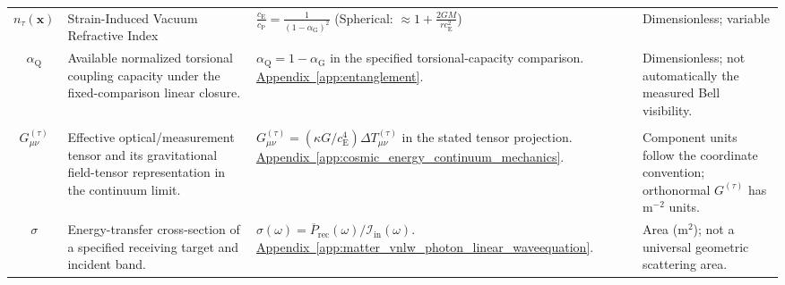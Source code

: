 \begin{longtable}{@{} c p{5.5cm} p{4cm} p{3.5cm} @{}}
$n_\tau(\mathbf{x})$ & Strain-Induced Vacuum Refractive Index & $\frac{c_{\mathrm{E}}}{c_{\mathrm{P}}} = \frac{1}{(1-\alpha_{\mathrm{G}})^2}$ \newline (Spherical: $\approx 1+\frac{2GM}{rc_{\mathrm{E}}^2}$) & Dimensionless; variable \\

$\alpha_{\mathrm Q}$ & {\raggedright Available normalized torsional coupling capacity under the fixed-comparison linear closure.\par} & {\raggedright $\alpha_{\mathrm Q}=1-\alpha_{\mathrm G}$ in the specified torsional-capacity comparison. \newline \hyperref[app:entanglement]{Appendix~\ref*{app:entanglement}}.\par} & {\raggedright Dimensionless; not automatically the measured Bell visibility.\par} \\

\begin{tabular}[c]{@{}c@{}}$g_{\mu\nu}^{(\tau)}$ \\ $G_{\mu\nu}^{(\tau)}$\end{tabular} & {\raggedright Effective optical/measurement tensor and its gravitational field-tensor representation in the continuum limit.\par} & {\raggedright $G_{\mu\nu}^{(\tau)}=(\kappa G/c_{\mathrm E}^4)\Delta T_{\mu\nu}^{(\tau)}$ in the stated tensor projection. \newline \hyperref[app:cosmic_energy_continuum_mechanics]{Appendix~\ref*{app:cosmic_energy_continuum_mechanics}}.\par} & {\raggedright Component units follow the coordinate convention; orthonormal $G^{(\tau)}$ has $\mathrm{m^{-2}}$ units.\par} \\


$\sigma$ & {\raggedright Energy-transfer cross-section of a specified receiving target and incident band.\par} & {\raggedright $\sigma(\omega)=\overline P_{\mathrm{rec}}(\omega)/\mathcal I_{\mathrm{in}}(\omega)$. \newline \hyperref[app:matter_vnlw_photon_linear_waveequation]{Appendix~\ref*{app:matter_vnlw_photon_linear_waveequation}}.\par} & {\raggedright Area ($\mathrm{m^2}$); not a universal geometric scattering area.\par} \\


\end{longtable}
